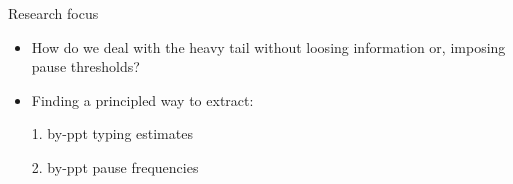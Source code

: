 
\begin{frame}{Research focus}

\begin{small}
\begin{itemize}
	\item How do we deal with the heavy tail without loosing information or, imposing pause thresholds?	
	\item Finding a principled way to extract:
	\item[1.] by-ppt typing estimates
	\item[2.] by-ppt pause frequencies
	

\end{itemize}
\end{small}

\end{frame}